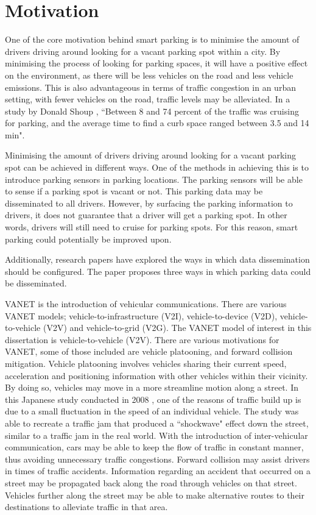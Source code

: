 \section{Motivation}
One of the core motivation behind smart parking is to minimise the amount of drivers driving around looking for a vacant parking spot within a city. By minimising the process of looking for parking spaces, it will have a positive effect on the environment, as there will be less vehicles on the road and less vehicle emissions. This is also advantageous in terms of traffic congestion in an urban setting, with fewer vehicles on the road, traffic levels may be alleviated. In a study by Donald Shoup \citep{Shoup2006CruisingParking}, ``Between 8 and 74 percent of the traffic was cruising for parking, and the average time to find a curb space ranged between 3.5 and 14 min".

Minimising the amount of drivers driving around looking for a vacant parking spot can be achieved in different ways. One of the methods in achieving this is to introduce parking sensors in parking locations. The parking sensors will be able to sense if a parking spot is vacant or not. This parking data may be disseminated to all drivers. However, by surfacing the parking information to drivers, it does not guarantee that a driver will get a parking spot. In other words, drivers will still need to cruise for parking spots. For this reason, smart parking could potentially be improved upon.

Additionally, \citep{Verroios2011ReachingNetworking} research papers have explored the ways in which data dissemination should be configured. The paper proposes three ways in which parking data could be disseminated. 

\ac{VANET} is the introduction of vehicular communications. There are various \ac{VANET} models; vehicle-to-infrastructure (V2I), vehicle-to-device (V2D), vehicle-to-vehicle (V2V) and vehicle-to-grid (V2G). The \ac{VANET} model of interest in this dissertation is vehicle-to-vehicle (V2V). There are various motivations for \ac{VANET}, some of those included are vehicle platooning, and forward collision mitigation. Vehicle platooning involves vehicles sharing their current speed, acceleration and positioning information with other vehicles within their vicinity. By doing so, vehicles may move in a more streamline motion along a street. In this Japanese study conducted in 2008 \citep{Sugiyamal2008TrafficJam}, one of the reasons of traffic build up is due to a small fluctuation in the speed of an individual vehicle. The study was able to recreate a traffic jam that produced a ``shockwave" effect down the street, similar to a traffic jam in the real world. With the introduction of inter-vehicular communication, cars may be able to keep the flow of traffic in constant manner, thus avoiding unnecessary traffic congestions. Forward collision may assist drivers in times of traffic accidents. Information regarding an accident that occurred on a street may be propagated back along the road through vehicles on that street. Vehicles further along the street may be able to make alternative routes to their destinations to alleviate traffic in that area.

